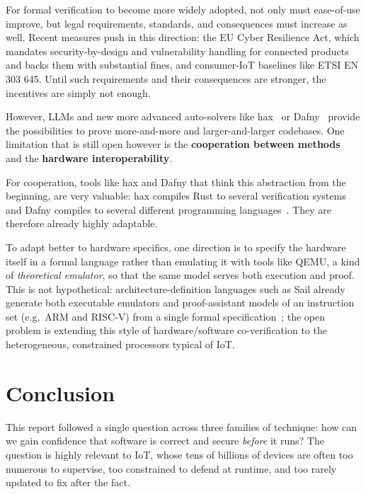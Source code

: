 \documentclass[conference]{IEEEtran}
\begin{document}
For formal verification to become more widely adopted, not only must ease-of-use improve, but legal requirements, standards, and consequences must increase as well. Recent measures push in this direction: the EU Cyber Resilience Act, which mandates security-by-design and vulnerability handling for connected products and backs them with substantial fines, and consumer-IoT baselines like ETSI EN 303 645. \cite{eu2024cra, etsi2024en303645} Until such requirements and their consequences are stronger, the incentives are simply not enough.

However, LLMs and new more advanced auto-solvers like hax~\cite{bhargavan2025hax} or Dafny~\cite{leino2010dafny} provide the possibilities to prove more-and-more and larger-and-larger codebases. One limitation that is still open however is the \textbf{cooperation between methods}~\cite{iotformalreview2024} and the \textbf{hardware interoperability}.

For cooperation, tools like hax and Dafny that think this abstraction from the beginning, are very valuable: hax compiles Rust to several verification systems~\cite{hax_cryspen} and Dafny compiles to several different programming languages~\cite{dafny_org}. They are therefore already highly adaptable.

To adapt better to hardware specifics, one direction is to specify the hardware itself in a formal language rather than emulating it with tools like QEMU, a kind of \emph{theoretical emulator}, so that the same model serves both execution and proof. This is not hypothetical: architecture-definition languages such as Sail already generate both executable emulators and proof-assistant models of an instruction set (e.g.\ ARM and RISC-V) from a single formal specification~\cite{armstrong2019sail}; the open problem is extending this style of hardware/software co-verification to the heterogeneous, constrained processors typical of IoT.

\section{Conclusion}

This report followed a single question across three families of technique: how can we gain confidence that software is correct and secure \emph{before} it runs? The question is highly relevant to IoT, whose tens of billions of devices are often too numerous to supervise, too constrained to defend at runtime, and too rarely updated to fix after the fact. 
\end{document}
